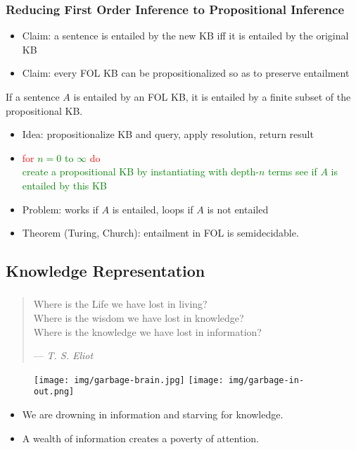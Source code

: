 \documentclass[UTF8,11pt,colorlinks,compress,openany]{beamer}%
\begin{document}
\begin{frame}\frametitle{Reducing First Order Inference to Propositional Inference}
\begin{itemize}
	\item Claim: a sentence is entailed by the new KB iff it is entailed by the original KB
	\item Claim: every FOL KB can be propositionalized so as to preserve entailment
\end{itemize}
\begin{theorem}
If a sentence $A$ is entailed by an FOL KB, it is entailed by a finite subset of the propositional KB.
\end{theorem}
\begin{itemize}
	\item Idea: propositionalize KB and query, apply resolution, return result
	\item[] \hspace{-1em}\textcolor{red}{for} \textcolor{green}{$n=0$ to $\infty$} \textcolor{red}{do}\\
	\textcolor{green}{create a propositional KB by instantiating with depth-$n$ terms see if $A$ is entailed by this KB}
	\item Problem: works if $A$ is entailed, loops if $A$ is not entailed
	\item Theorem (Turing, Church): entailment in FOL is semidecidable.
\end{itemize}
\end{frame}

\subsection{Knowledge Representation}

\begin{frame}\frametitle{}
\begin{quote}
Where is the Life we have lost in living?\\
Where is the wisdom we have lost in knowledge?\\
Where is the knowledge we have lost in information?\par
\hfill --- \textsl{T. S. Eliot}
\end{quote}
\begin{figure}[H]
\texttt{[image: img/garbage-brain.jpg]}
\texttt{[image: img/garbage-in-out.png]}
\end{figure}
\begin{itemize}
	\item We are drowning in information and starving for knowledge.
	\item A wealth of information creates a poverty of attention.
\end{itemize}
\end{frame}
\end{document}
